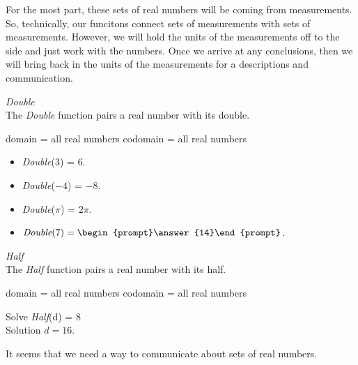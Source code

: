 \documentclass{ximera}
\begin{document}
For the most part, these sets of real numbers will be coming from measurements.  So, technically, our funcitons connect sets of measurements with sets of measurements. However, we will hold the units of the measurements off to the side and just work with the numbers.  Once we arrive at any conclusions, then we will bring back in the units of the measurements for a descriptions and communication.


\begin{example} \textit{Double} \\
The \textit{Double} function pairs a real number with its double.

domain = all real numbers  
codomain = all real numbers


\begin{itemize}
\item \textit{Double}($3$) = $6$.
\item \textit{Double}($-4$) = $-8$.
\item \textit{Double}($\pi$) = $2 \pi$.

\item $\textit{Double}(7) = \begin{prompt}\answer{14}\end{prompt}$.



\end{itemize}

\end{example} 



\begin{example} \textit{Half} \\
The \textit{Half} function pairs a real number with its half.

domain = all real numbers  
codomain = all real numbers


Solve \textit{Half}(d) = $8$ \\

Solution $d = 16$.

\end{example} 


It seems that we need a way to communicate about sets of real numbers.
\end{document}
